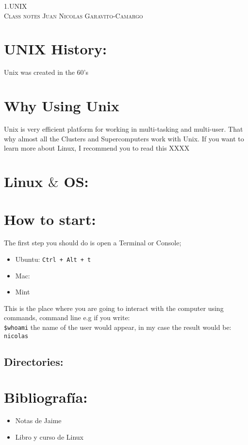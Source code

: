 \documentclass[letterpaper]{article}
\begin{document}
\begin{center}
\textsc{\LARGE 1.UNIX}\\
\textsc{\large Class notes Juan Nicolas Garavito-Camargo}\\
\end{center}

\section*{UNIX History:}

Unix was created in the 60's

\section*{Why Using Unix}

Unix is very efficient platform for working in multi-tasking and multi-user. That why 
almost all the Clusters and Supercomputers  work with Unix.
If you want to learn more about Linux, I recommend you to read this XXXX 

\section*{Linux $\&$ OS:}

\section*{How to start:}

The first step you should do is open a Terminal or Console; 

\begin{itemize}
\item Ubuntu: \verb"Ctrl + Alt + t"
\item Mac:
\item Mint
\end{itemize}

This is the place where you are going to interact with the computer using commands, 
command line e.g if you write:\\

\verb"$whoami" the name of the user would appear, in my case the result would be:
\verb"nicolas" 

\subsection*{Directories:}



\section*{Bibliograf\'ia:}
\begin{itemize}
\item Notas de Jaime
\item Libro y curso de Linux
\end{itemize}
\end{document}
